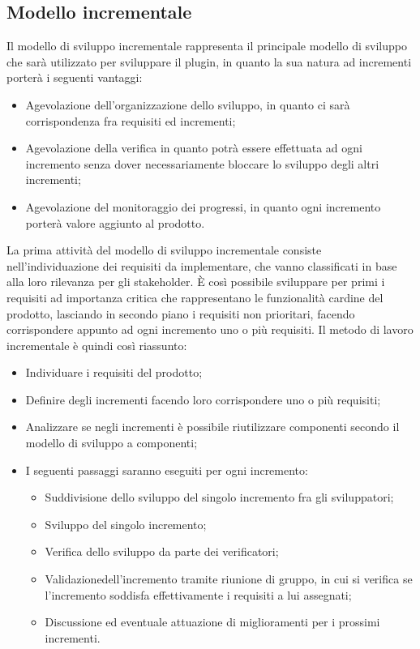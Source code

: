 \subsection{Modello incrementale}
Il modello di sviluppo incrementale rappresenta il principale modello di sviluppo che sarà utilizzato per sviluppare il plugin, in quanto la sua natura ad incrementi porterà i seguenti vantaggi:
\begin{itemize}
	\item Agevolazione dell'organizzazione dello sviluppo, in quanto ci sarà corrispondenza fra requisiti ed incrementi;
	\item Agevolazione della verifica in quanto potrà essere effettuata ad ogni incremento senza dover necessariamente bloccare lo sviluppo degli altri incrementi;
	\item Agevolazione del monitoraggio dei progressi, in quanto ogni incremento porterà valore aggiunto al prodotto\glo.
\end{itemize}
La prima attività del modello di sviluppo incrementale consiste nell'individuazione dei requisiti da implementare, che vanno classificati in base alla loro rilevanza per gli stakeholder\glo. È così possibile sviluppare per primi i requisiti ad importanza critica che rappresentano le funzionalità cardine del prodotto\glo, lasciando in secondo piano i requisiti non prioritari, facendo corrispondere appunto ad ogni incremento uno o più requisiti.
Il metodo di lavoro incrementale è quindi così riassunto:
\begin{itemize}
	\item Individuare i requisiti del prodotto\glo;
	\item Definire degli incrementi facendo loro corrispondere uno o più requisiti;
	\item Analizzare se negli incrementi è possibile riutilizzare componenti secondo il modello di sviluppo a componenti;
	\item I seguenti passaggi saranno eseguiti per ogni incremento:
	\begin{itemize}
		\item Suddivisione dello sviluppo del singolo incremento fra gli sviluppatori;
		\item Sviluppo del singolo incremento;
		\item Verifica dello sviluppo da parte dei verificatori;
		\item Validazione\glosp dell'incremento tramite riunione di gruppo, in cui si verifica se l'incremento soddisfa effettivamente i requisiti a lui assegnati;
		\item Discussione ed eventuale attuazione di miglioramenti per i prossimi incrementi.
	\end{itemize}
\end{itemize}

